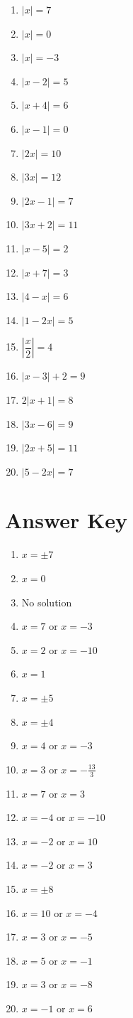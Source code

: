 \documentclass[11pt]{article}
\begin{document}
\begin{multicols}{2}
\begin{enumerate}[leftmargin=1.6em,itemsep=4pt]
  \item $|x| = 7$
  \item $|x| = 0$
  \item $|x| = -3$
  \item $|x - 2| = 5$
  \item $|x + 4| = 6$
  \item $|x - 1| = 0$
  \item $|2x| = 10$
  \item $|3x| = 12$
  \item $|2x - 1| = 7$
  \item $|3x + 2| = 11$
  \item $|x - 5| = 2$
  \item $|x + 7| = 3$
  \item $|4 - x| = 6$
  \item $|1 - 2x| = 5$
  \item $\left|\dfrac{x}{2}\right| = 4$
  \item $|x - 3| + 2 = 9$
  \item $2|x + 1| = 8$
  \item $|3x - 6| = 9$
  \item $|2x + 5| = 11$
  \item $|5 - 2x| = 7$
\end{enumerate}
\end{multicols}

\bigskip
\section*{Answer Key}

\begin{multicols}{2}
\begin{enumerate}[leftmargin=1.8em,itemsep=2pt]
  \item $x = \pm 7$
  \item $x = 0$
  \item No solution
  \item $x = 7$ or $x = -3$
  \item $x = 2$ or $x = -10$
  \item $x = 1$
  \item $x = \pm 5$
  \item $x = \pm 4$
  \item $x = 4$ or $x = -3$
  \item $x = 3$ or $x = -\tfrac{13}{3}$
  \item $x = 7$ or $x = 3$
  \item $x = -4$ or $x = -10$
  \item $x = -2$ or $x = 10$
  \item $x = -2$ or $x = 3$
  \item $x = \pm 8$
  \item $x = 10$ or $x = -4$
  \item $x = 3$ or $x = -5$
  \item $x = 5$ or $x = -1$
  \item $x = 3$ or $x = -8$
  \item $x = -1$ or $x = 6$
\end{enumerate}
\end{multicols}
\end{document}
